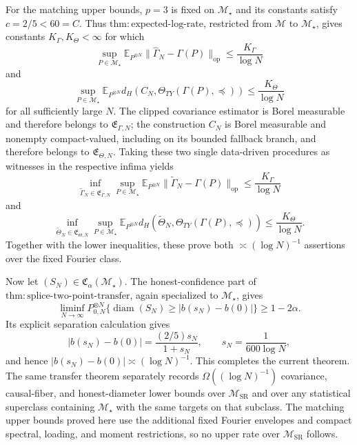 For the matching upper bounds, \(p=3\) is fixed on \(\mathcal M_\star\) and its constants satisfy \(c=2/5<60=C\).  Thus \(\mathrm{thm:expected\text{-}log\text{-}rate}\), restricted from \(\mathcal M\) to \(\mathcal M_\star\), gives constants \(K_\Gamma,K_\Theta<\infty\) for which
\[
 \sup_{P\in\mathcal M_\star}
 \mathbb E_{P^{\otimes N}}\|\widehat\Gamma_N-\Gamma(P)\|_{\mathrm{op}}
 \le\frac{K_\Gamma}{\log N}
\]
and
\[
 \sup_{P\in\mathcal M_\star}
 \mathbb E_{P^{\otimes N}}
 d_H\!\left(C_N,\Theta_{TY}(\Gamma(P),\preceq)\right)
 \le\frac{K_\Theta}{\log N}
\]
for all sufficiently large \(N\).  The clipped covariance estimator is Borel measurable and therefore belongs to \(\mathfrak E_{\Gamma,N}\); the construction \(C_N\) is Borel measurable and nonempty compact-valued, including on its bounded fallback branch, and therefore belongs to \(\mathfrak E_{\Theta,N}\).  Taking these two single data-driven procedures as witnesses in the respective infima yields
\[
 \inf_{\widetilde\Gamma_N\in\mathfrak E_{\Gamma,N}}
 \sup_{P\in\mathcal M_\star}
 \mathbb E_{P^{\otimes N}}\|\widetilde\Gamma_N-\Gamma(P)\|_{\mathrm{op}}
 \le\frac{K_\Gamma}{\log N}
\]
and
\[
 \inf_{\widetilde\Theta_N\in\mathfrak E_{\Theta,N}}
 \sup_{P\in\mathcal M_\star}
 \mathbb E_{P^{\otimes N}}
 d_H\!\left(\widetilde\Theta_N,\Theta_{TY}(\Gamma(P),\preceq)\right)
 \le\frac{K_\Theta}{\log N}.
\]
Together with the lower inequalities, these prove both \(\asymp(\log N)^{-1}\) assertions over the fixed Fourier class.

Now let \((S_N)\in\mathfrak C_\alpha(\mathcal M_\star)\).  The honest-confidence part of \(\mathrm{thm:splice\text{-}two\text{-}point\text{-}transfer}\), again specialized to \(\mathcal M_\star\), gives
\[
 \liminf_{N\to\infty}P_{0,N}^{\otimes N}
 \{\operatorname{diam}(S_N)\ge|b(s_N)-b(0)|\}\ge1-2\alpha.
\]
Its explicit separation calculation gives
\[
 |b(s_N)-b(0)|=\frac{(2/5)s_N}{1+s_N},
 \qquad s_N=\frac1{600\log N},
\]
and hence \(|b(s_N)-b(0)|\asymp(\log N)^{-1}\).  This completes the current theorem.  The same transfer theorem separately records \(\Omega((\log N)^{-1})\) covariance, causal-fiber, and honest-diameter lower bounds over \(\mathcal M_{\mathrm{SR}}\) and over any statistical superclass containing \(\mathcal M_\star\) with the same targets on that subclass.  The matching upper bounds proved here use the additional fixed Fourier envelopes and compact spectral, loading, and moment restrictions, so no upper rate over \(\mathcal M_{\mathrm{SR}}\) follows.
